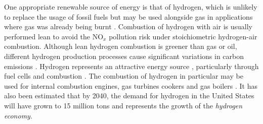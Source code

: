 One appropriate renewable source of energy is that of hydrogen, which is unlikely to replace the usage of fossil fuels but may be used alongside gas in applications where gas was already being burnt \cite{momirlan2005PropertiesHydrogenFuel}. Combustion of hydrogen with air is usually performed lean to avoid the NO$_x$ pollution risk under stoichiometric hydrogen-air combustion. Although lean hydrogen combustion is greener than gas or oil, different hydrogen production processes \cite{dasilvaveras2017HydrogenTrendsProduction} cause significant variations in carbon emissions \cite{nationalgrid2022HeatingOurHomes}. Hydrogen represents an attractive energy source \cite{momirlan2005PropertiesHydrogenFuel}, particularly through fuel cells \cite{momirlan2005PropertiesHydrogenFuel} and combustion \cite{lanz2001Module3Hydrogen, stepien2021ComprehensiveOverviewHydrogenFueled}. The combustion of hydrogen in particular may be used for internal combustion engines, gas turbines cookers and gas boilers \cite{momirlan2005PropertiesHydrogenFuel}. It has also been estimated that by 2040, the demand for hydrogen in the United States will have grown to 15 million tons \cite{molkov2007HydrogenSafetyResearch} and represents the growth of the \emph{hydrogen economy}.

